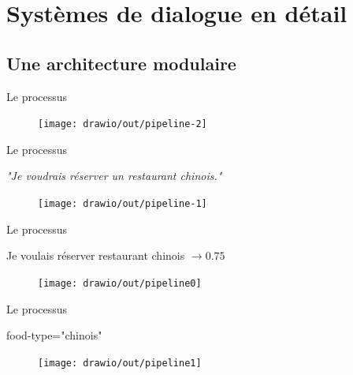 \documentclass[french]{beamer}
\begin{document}
    \section{Systèmes de dialogue en détail}



    \subsection{Une architecture modulaire}

    \begin{frame}{Le processus}
        \begin{block}{}
        \end{block}
        \begin{figure}
            \centering
            \texttt{[image: drawio/out/pipeline-2]}
        \end{figure}
    \end{frame}

    \begin{frame}{Le processus}
        \begin{block}{}
            \textit{"Je voudrais réserver un restaurant chinois."}
        \end{block}
        \begin{figure}
            \centering
            \texttt{[image: drawio/out/pipeline-1]}
        \end{figure}
    \end{frame}

    \begin{frame}{Le processus}
        \begin{block}{}
            Je voulais réserver restaurant chinois $\rightarrow 0.75$
        \end{block}
        \begin{figure}
            \centering
            \texttt{[image: drawio/out/pipeline0]}
        \end{figure}
    \end{frame}

    \begin{frame}{Le processus}
        \begin{block}{}
            food-type="chinois"
        \end{block}
        \begin{figure}
            \centering
            \texttt{[image: drawio/out/pipeline1]}
        \end{figure}
    \end{frame}
\end{document}
